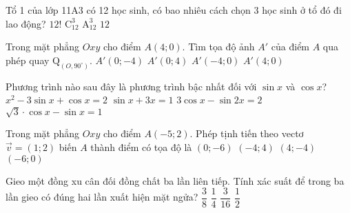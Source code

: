 \begin{ex}%
	Tổ 1 của lớp 11A3 có 12 học sinh, có bao nhiêu cách chọn 3 học sinh ở tổ đó đi lao động?
	\choice
	{$12!$}
	{\True $\mathrm{C}^3_{12}$}
	{$\mathrm{A}^3_{12}$}
	{$12$}
\end{ex}
\begin{ex}%
	Trong mặt phẳng $Oxy$ cho điểm $A(4;0)$. Tìm tọa độ ảnh $A'$ của điểm $A$ qua phép quay $\mathrm{Q}_{\left(O,90^\circ\right)}$.
	\choice
	{$A'(0;-4)$}
	{\True $A'(0;4)$}
	{ $A'(-4;0)$}
	{$A'(4;0)$}
\end{ex}
\begin{ex}%
	Phương trình nào sau đây là phương trình bậc nhất đối với $\sin x$ và $\cos x$?
	\choice
	{$x^2 - 3\sin x + \cos x = 2$}
	{$\sin x + 3x = 1$}
	{$3\cos x - \sin 2x = 2$}
	{\True $\sqrt 3 \cdot \cos x - \sin x = 1$}
\end{ex}
\begin{ex}%
	Trong mặt phẳng $Oxy$ cho điểm $A(-5;2)$. Phép tịnh tiến theo vectơ $\vec{v}=(1;2)$ biến $A$ thành điểm có tọa độ là
	\choice
	{$(0;-6)$}
	{\True $(-4;4)$}
	{$(4;-4)$}
	{$(-6;0)$}
\end{ex}
\begin{ex}%
	Gieo một đồng xu cân đối đồng chất ba lần liên tiếp. Tính xác suất để trong ba lần gieo có đúng hai lần xuất hiện mặt ngửa?
	\choice
	{\True $\dfrac{3}{8}$}
	{$\dfrac{1}{4}$}
	{$\dfrac{3}{16}$}
	{$\dfrac{1}{2}$}
\end{ex}
